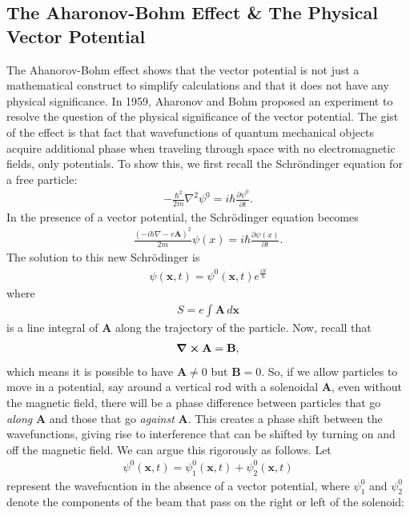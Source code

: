 \documentclass{book}
\numberwithin{equation}{section}
\theoremstyle{definition}
\newcommand{\p}{\partial}
\begin{document}
\subsection{The Aharonov-Bohm Effect \& The Physical Vector Potential}
The Ahanorov-Bohm effect shows that the vector potential is not just a mathematical construct to simplify calculations and that it does not have any physical significance. In 1959, Aharonov and Bohm proposed an experiment to resolve the question of the physical significance of the vector potential. The gist of the effect is that fact that wavefunctions of quantum mechanical objects acquire additional phase when traveling through space with no electromagnetic fields, only potentials. To show this, we first recall the Schr\"ondinger equation for a free particle:
\begin{align}
-\frac{\hbar^2}{2m}\nabla^2 \psi^0 = i\hbar \frac{\p \psi^0}{\p t}.
\end{align}
In the presence of a vector potential, the Schr\"odinger equation becomes
\begin{align}
\frac{(-i\hbar\nabla - e\mathbf{A})^2}{2m} \psi(x) = i\hbar \frac{\p \psi(x)}{\p t}.
\end{align}
The solution to this new Schr\"odinger is
\begin{align}
\psi(\mathbf{x},t) = \psi^0(\mathbf{x},t)e^{\frac{iS}{\hbar}}
\end{align}
where
\begin{align}
S = e\int \mathbf{A}\,d\mathbf{x}
\end{align}
is a line integral of $\mathbf{A}$ along the trajectory of the particle. Now, recall that
\begin{align}
\curl{\mathbf{A}} = \mathbf{B},
\end{align}
which means it is possible to have $\mathbf{A} \neq 0$ but $\mathbf{B} = 0$. So, if we allow particles to move in a potential, say around a vertical rod with a solenoidal $\mathbf{A}$, even without the magnetic field, there will be a phase difference between particles that go \textit{along} $\mathbf{A}$ and those that go \textit{against} $\mathbf{A}$. This creates a phase shift between the wavefunctions, giving rise to interference that can be shifted by turning on and off the magnetic field. We can argue this rigorously as follows. Let
\begin{align}
\psi^0(\mathbf{x},t) = \psi_1^0(\mathbf{x},t) + \psi_2^0(\mathbf{x},t)
\end{align}
represent the wavefucntion in the absence of a vector potential, where $\psi^0_1$ and $\psi^0_2$ denote the components of the beam that pass on the right or left of the solenoid:
\end{document}

